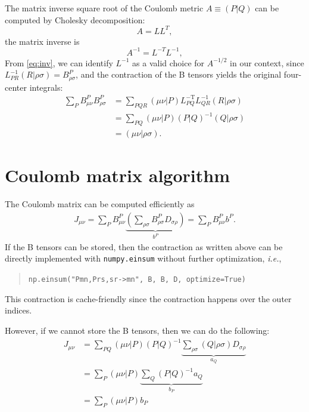 \documentclass[aip,preprint]{revtex4-1}
\begin{document}
The matrix inverse square root of the Coulomb metric $A\equiv (P|Q)$ can be computed by Cholesky decomposition:
\begin{equation}
A = L L^T,
\end{equation}
the matrix inverse is 
\begin{equation}
\label{eq:inv}
A^{-1} = L^{-T} L^{-1},
\end{equation}
From \cref{eq:inv}, we can identify $L^{-1}$ as a valid choice for $A^{-1/2}$ in our context, since $L^{-1}_{PR}(R|\rho \sigma) = B^{P}_{\rho \sigma}$, and the contraction of the B tensors yields the original four-center integrals:
\begin{align}
\sum_{P} B^{P}_{\mu \nu} B^{P}_{\rho \sigma} 
& = \sum_{PQR}(\mu \nu | P) L^{-\text{T}}_{PQ} L^{-1}_{QR} (R|\rho \sigma) \\
& = \sum_{PQ}(\mu \nu | P) (P|Q)^{-1} (Q|\rho \sigma) \\
& = (\mu \nu | \rho \sigma).
\end{align}

\section{Coulomb matrix algorithm}

The Coulomb matrix can be computed efficiently as
\begin{equation}
\begin{split}
J_{\mu \nu} = \sum_{P} B^{P}_{\mu \nu}
\underbrace{\left( \sum_{\rho \sigma}B^{P}_{\rho \sigma} D_{\sigma \rho} \right)}_{b^P}=
\sum_{P} B^{P}_{\mu \nu} b^P.
\end{split}
\end{equation}
If the B tensors can be stored, then the contraction as written above can be directly implemented with \texttt{numpy.einsum} without further optimization, \textit{i.e.},
\begin{quote}
    \texttt{np.einsum("Pmn,Prs,sr->mn", B, B, D, optimize=True)}
\end{quote}
This contraction is cache-friendly since the contraction happens over the outer indices.

However, if we cannot store the B tensors, then we can do the following:
\begin{equation}
\begin{split}
J_{\mu \nu} & = \sum_{PQ} (\mu \nu | P) (P|Q)^{-1}
\underbrace{\sum_{\rho \sigma} (Q|\rho \sigma) D_{\sigma \rho}}_{a_Q} \\
 & = \sum_{P} (\mu \nu | P) \underbrace{\sum_{Q} (P|Q)^{-1} a_Q}_{b_P} \\
 & = \sum_{P} (\mu \nu | P) b_P
\end{split}
\end{equation}
\end{document}
